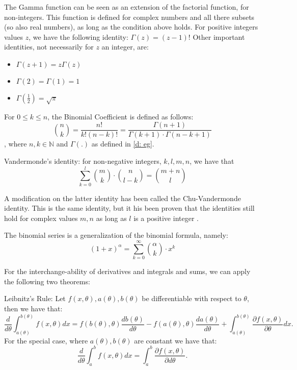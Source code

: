 The Gamma function can be seen as an extension of the factorial function, for non-integers. This function is defined for complex numbers and all there subsets (so also real numbers), as long as the condition above holds. For positive integers values \(z\), we have the following identity: \(\Gamma(z) = (z - 1)!\)
Other important identities, not necessarily for \(z\) an integer, are: 
\begin{itemize}
    \item \(\Gamma(z + 1) = z \Gamma(z)\)
    \item \(\Gamma(2) = \Gamma(1) = 1\)
    \item \(\Gamma(\frac{1}{2}) = \sqrt{\pi}\)
\end{itemize}


\begin{definition}
    For \(0 \leq k \leq n\), the Binomial Coefficient is defined as follows: \[\binom{n}{k} = \frac{n!}{k! (n - k)!} = \frac{\Gamma(n + 1)}{\Gamma(k + 1) \cdot \Gamma( n - k  + 1)}\], where \(n, k \in \mathbb{N}\) and \(\Gamma(.)\) as defined in \ref{d: eg}.
\end{definition}


\begin{definition}
    Vandermonde's identity: for non-negative integers, \(k, l, m, n\), we have that \[\sum_{k = 0}^{l} \binom{m}{k} \cdot \binom{n}{l - k} = \binom{m + n}{l}\]
\end{definition}
A modification on the latter identity has been called the Chu-Vandermonde identity. This is the same identity, but it his been proven that the identities still hold for complex values \(m, n\) as long as \(l\) is a positive integer \cite{askey75}.

\begin{definition}\label{d: binomial}
    The binomial series is a generalization of the binomial formula, namely:
    \[(1 + x)^\alpha = \sum_{k = 0}^{\infty}\binom{\alpha}{k} \cdot x^k\]
\end{definition}

For the interchange-ability of derivatives and integrals and sums, we can apply the following two theorems:

\begin{theorem}
    Leibnitz's Rule:
    Let \(f(x, \theta), a(\theta), b(\theta)\) be differentiable with respect to \(\theta\), then we have that:
    \[ \frac{d}{d\theta} \int_{a(\theta)}^{b(\theta)} f(x, \theta) dx = f(b(\theta), \theta) \frac{d b(\theta)}{d\theta} - f(a(\theta), \theta) \frac{d a(\theta)}{d\theta} + \int_{a(\theta)}^{b(\theta)} \frac{\partial f(x, \theta) }{\partial \theta} dx.\] For the special case, where \(a(\theta), b(\theta)\) are constant we have that: 
    \[\frac{d}{d\theta} \int_{a}^{b} f(x, \theta) dx =  \int_{a}^{b} \frac{ \partial f(x, \theta)}{ \partial d\theta}.\]
\end{theorem}

